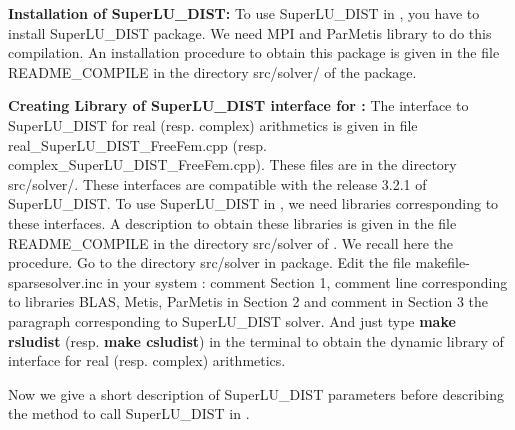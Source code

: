 \documentclass[a4paper,twoside,12pt]{book}
\begin{document}
\begin{paragraph}
{\bf{Installation of SuperLU\_DIST:}}
To use SuperLU\_DIST in \freefempp, you have to install SuperLU\_DIST package. We need MPI and ParMetis library to do this compilation. An installation procedure to obtain this package is given in the file README\_COMPILE in the directory src/solver/  of the \freefempp package.
\end{paragraph}

\begin{paragraph}
{\bf{Creating Library of SuperLU\_DIST interface for \freefempp:}}
The \freefempp interface to SuperLU\_DIST for real (resp. complex) arithmetics is given in file \\
real\_SuperLU\_DIST\_FreeFem.cpp (resp. complex\_SuperLU\_DIST\_FreeFem.cpp). These files  are in the directory src/solver/.  These interfaces are compatible with the release 3.2.1 of SuperLU\_DIST. To use SuperLU\_DIST in \freefempp, we need libraries corresponding to these interfaces. A description to obtain these libraries is given in the file README\_COMPILE in the directory
src/solver of \freefempp. We recall here the procedure. Go to the directory src/solver in \freefempp package. Edit the file makefile-sparsesolver.inc in your system : comment Section 1, comment line corresponding to libraries BLAS, Metis, ParMetis in Section 2 and comment in Section 3 the paragraph corresponding to SuperLU\_DIST solver. And just type {\bf{make rsludist}} (resp. {\bf{make csludist}})  in the terminal to obtain the dynamic library of interface for real (resp. complex) arithmetics.
\end{paragraph}

Now we give a short description of SuperLU\_DIST parameters before describing the method to call SuperLU\_DIST in \freefempp.
\end{document}
